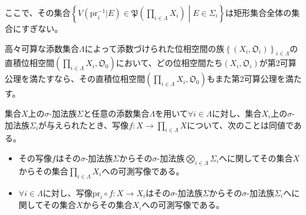 \documentclass[dvipdfmx]{jsarticle}
\begin{document}
ここで、その集合$\left\{ V\left( \mathrm{pr}_{i}^{- 1}|E \right)\in \mathfrak{P}\left( \prod_{i \in \varLambda} X_{i} \right) \middle| E \in \varSigma_{i} \right\}$は矩形集合全体の集合にすぎない。
\begin{thm*}
高々可算な添数集合$\varLambda$によって添数づけられた位相空間の族$\left\{ \left( X_{i},\mathfrak{O}_{i} \right) \right\}_{i \in \varLambda }$の直積位相空間$\left( \prod_{i \in \varLambda } X_{i},\mathfrak{O}_{0} \right)$において、どの位相空間たち$\left( X_{i},\mathfrak{O}_{i} \right)$が第2可算公理を満たすなら、その直積位相空間$\left( \prod_{i \in \varLambda } X_{i},\mathfrak{O}_{0} \right)$もまた第2可算公理を満たす。
\end{thm*}
\begin{thm*}
集合$X$上の$\sigma$-加法族$\varSigma$と任意の添数集合$\varLambda$を用いて$\forall i \in \varLambda$に対し、集合$X_{i}$上の$\sigma$-加法族$\varSigma_{i}$が与えられたとき、写像$f:X \rightarrow \prod_{i \in \varLambda} X$について、次のことは同値である。
\begin{itemize}
\item
  その写像$f$はその$\sigma$-加法族$\varSigma$からその$\sigma$-加法族$\bigotimes_{i \in \varLambda} \varSigma_{i}$へに関してその集合$X$からその集合$\prod_{i \in \varLambda} X_{i}$への可測写像である。
\item
  $\forall i \in \varLambda$に対し、写像$\mathrm{pr}_{i} \circ f:X \rightarrow X_{i}$はその$\sigma$-加法族$\varSigma$からその$\sigma$-加法族$\varSigma_{i}$へに関してその集合$X$からその集合$X_{i}$への可測写像である。
\end{itemize}
\end{thm*}
\end{document}
